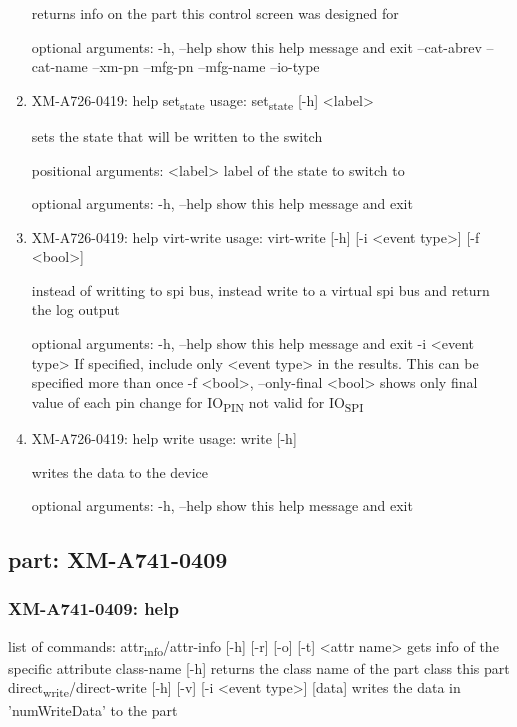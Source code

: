 \documentclass[11pt]{article}
\begin{document}
\begin{enumerate}
returns info on the part this control screen was designed for

optional arguments:
  -h, --help   show this help message and exit
  --cat-abrev
  --cat-name
  --xm-pn
  --mfg-pn
  --mfg-name
  --io-type

\item XM-A726-0419: help set\textsubscript{state}
\label{sec:orged7f7f9}
usage: set\textsubscript{state} [-h] <label>

sets the state that will be written to the switch

positional arguments:
  <label>     label of the state to switch to

optional arguments:
  -h, --help  show this help message and exit

\item XM-A726-0419: help virt-write
\label{sec:org500e67c}
usage: virt-write [-h] [-i <event type>] [-f <bool>]

instead of writting to spi bus, instead write to a virtual spi bus and return
the log output

optional arguments:
  -h, --help            show this help message and exit
  -i <event type>       If specified, include only <event type> in the
                        results. This can be specified more than once
  -f <bool>, --only-final <bool>
                        shows only final value of each pin change for IO\textsubscript{PIN}
                        not valid for IO\textsubscript{SPI}

\item XM-A726-0419: help write
\label{sec:orge5d1d53}
usage: write [-h]

writes the data to the device

optional arguments:
  -h, --help  show this help message and exit
\end{enumerate}

\subsection{part: XM-A741-0409}
\label{sec:orgd4eb2b5}
\subsubsection{XM-A741-0409: help}
\label{sec:org046120f}
list of commands:
  attr\textsubscript{info}/attr-info [-h] [-r] [-o] [-t] <attr name>
    gets info of the specific attribute
  class-name [-h]
    returns the class name of the part class this part
  direct\textsubscript{write}/direct-write [-h] [-v] [-i <event type>] [data]
    writes the data in 'numWriteData' to the part
\end{document}
